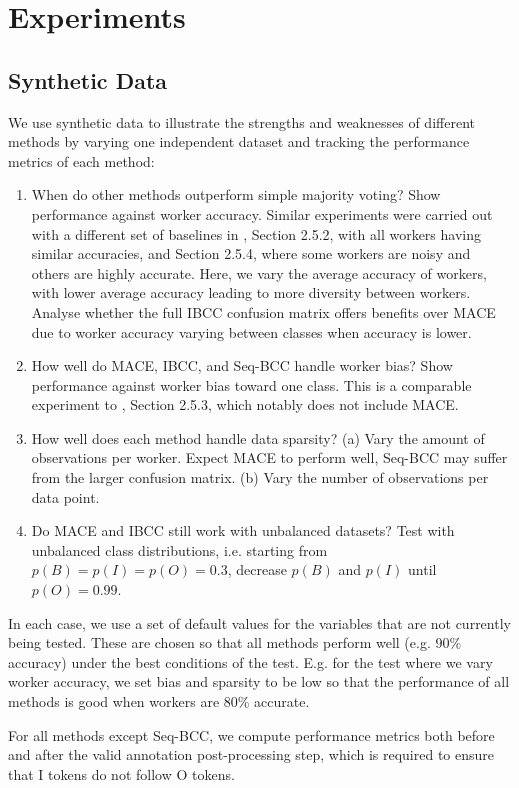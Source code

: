 \section{Experiments}

\subsection{Synthetic Data}

We use synthetic data to illustrate the strengths and weaknesses of different methods by varying one independent
dataset and tracking the performance metrics of each method:
\begin{enumerate}
  \item When do other methods outperform simple majority voting? Show performance against worker accuracy.
  Similar experiments were carried out with a different set of baselines in \cite{Simpson2014Thesis}, Section 2.5.2, with all workers having similar accuracies, and Section 2.5.4, where some workers are noisy and others are highly accurate. Here, we vary the average accuracy of workers, with lower average accuracy leading to more diversity between workers. Analyse whether the full IBCC confusion matrix offers benefits over MACE due to worker accuracy varying between classes when accuracy is lower. 
  \item How well do MACE, IBCC, and Seq-BCC handle worker bias? Show performance against worker bias toward one class. This is a comparable experiment to \cite{Simpson2014Thesis}, Section 2.5.3, which notably does not include MACE.
  \item How well does each method handle data sparsity? (a) Vary the amount of observations per worker. Expect MACE to perform well, Seq-BCC may suffer from the larger confusion matrix. (b) Vary the number of observations per data point. 
  \item Do MACE and IBCC still work with unbalanced datasets? Test with unbalanced class distributions, i.e. starting from $p(B) = p(I) = p(O) = 0.3$, decrease
  $p(B)$ and $p(I)$ until $p(O) = 0.99$.
\end{enumerate}
In each case, we use a set of default values for the variables that are not currently being tested. These are
 chosen so that all methods perform well (e.g. 90\% accuracy) under the best conditions of the test. E.g. for the test where we vary worker accuracy, we set bias and sparsity to be low so that the performance of all methods is good when workers are 80\% accurate.

For all methods except Seq-BCC, we compute performance metrics both before and after the valid annotation post-processing step, which is required to ensure that I tokens do not follow O tokens.

